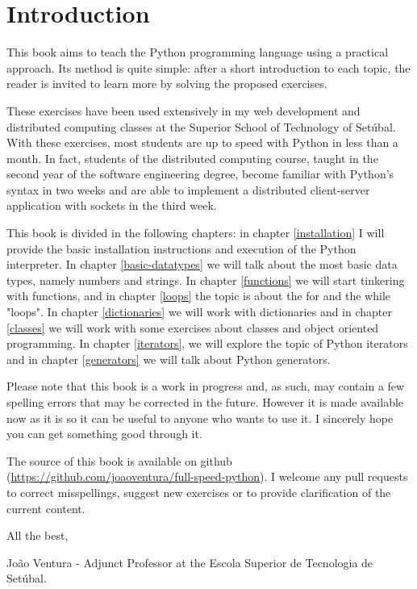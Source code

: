 \chapter{Introduction}\label{introduction}

This book aims to teach the Python programming language using a practical approach. Its method is quite simple: after a short introduction to each topic, the reader is invited to learn more by solving the proposed exercises.

These exercises have been used extensively in my web development and distributed computing classes at the Superior School of Technology of Setúbal. With these exercises, most students are up to speed with Python in less than a month. In fact, students of the distributed computing course, taught in the second year of the software engineering degree, become familiar with Python's syntax in two weeks and are able to implement a distributed client-server application with sockets in the third week.

This book is divided in the following chapters: in chapter \ref{installation} I will provide the basic installation instructions and execution of the Python interpreter. In chapter \ref{basic-datatypes} we will talk about the most basic data types, namely numbers and strings. In chapter \ref{functions} we will start tinkering with functions, and in chapter \ref{loops} the topic is about the for and the while "loops". In chapter \ref{dictionaries} we will work with dictionaries and in chapter \ref{classes} we will work with some exercises about classes and object oriented programming. In chapter \ref{iterators}, we will explore the topic of Python iterators and in chapter \ref{generators} we will talk about Python generators.

Please note that this book is a work in progress and, as such, may contain a few spelling errors that may be corrected in the future. However it is made available now as it is so it can be useful to anyone who wants to use it. I sincerely hope you can get something good through it.

The source of this book is available on github (\url{https://github.com/joaoventura/full-speed-python}). I welcome any pull requests to correct misspellings, suggest new exercises or to provide clarification of the current content.

All the best,

João Ventura - Adjunct Professor at the Escola Superior de Tecnologia de Setúbal.
